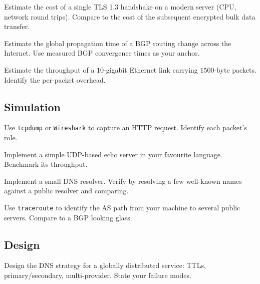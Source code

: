 \begin{exercise}
Estimate the cost of a single TLS 1.3 handshake on a modern server (CPU, network round trips). Compare to the cost of the subsequent encrypted bulk data transfer.
\end{exercise}

\begin{exercise}
Estimate the global propagation time of a BGP routing change across the Internet. Use measured BGP convergence times as your anchor.
\end{exercise}

\begin{exercise}
Estimate the throughput of a $10$-gigabit Ethernet link carrying $1500$-byte packets. Identify the per-packet overhead.
\end{exercise}

\subsection*{Simulation}

\begin{exercise}
Use \texttt{tcpdump} or \texttt{Wireshark} to capture an HTTP request. Identify each packet's role.
\end{exercise}

\begin{exercise}
Implement a simple UDP-based echo server in your favourite language. Benchmark its throughput.
\end{exercise}

\begin{exercise}
Implement a small DNS resolver. Verify by resolving a few well-known names against a public resolver and comparing.
\end{exercise}

\begin{exercise}
Use \texttt{traceroute} to identify the AS path from your machine to several public servers. Compare to a BGP looking glass.
\end{exercise}

\subsection*{Design}

\begin{exercise}
Design the DNS strategy for a globally distributed service: TTLs, primary/secondary, multi-provider. State your failure modes.
\end{exercise}

